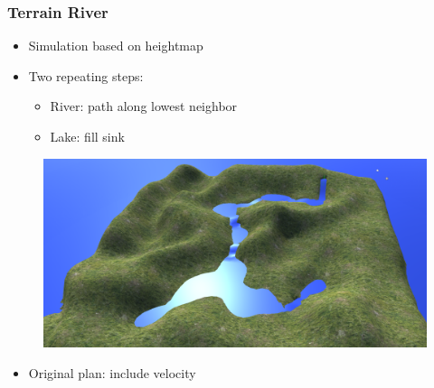 \documentclass[xcolor=dvipsnames]{beamer}
\begin{document}
	\begin{frame}
		\frametitle{Terrain River}
		\begin{itemize}
			\item Simulation based on heightmap
			\item Two repeating steps:
			\begin{itemize}
				\item River: path along lowest neighbor
				\item Lake: fill sink
			\end{itemize}
		\end{itemize}
		\begin{figure}[ht]
			\includegraphics[scale=0.21]{images/interim/river1}
		\end{figure}
		\begin{itemize}
			\item Original plan: include velocity
		\end{itemize}
	\end{frame}
	
\end{document}
